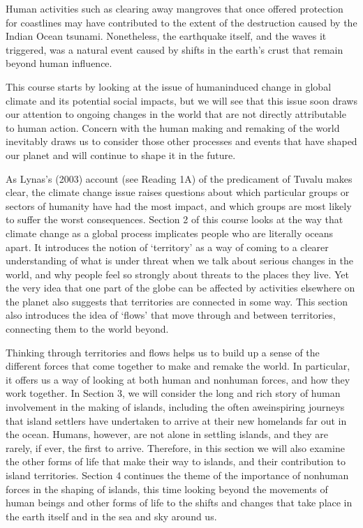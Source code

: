 \documentclass[letterpaper,10pt,english]{sphinxmanual}
\begin{document}
Human activities \textendash{} such as clearing away mangroves that once offered protection for coastlines \textendash{} may have contributed to the extent of the destruction caused by the Indian Ocean tsunami. Nonetheless, the earthquake itself, and the waves it triggered, was a natural event caused by shifts in the earth’s crust that remain beyond human influence.

This course starts by looking at the issue of human\sphinxhyphen{}induced change in global climate and its potential social impacts, but we will see that this issue soon draws our attention to ongoing changes in the world that are not directly attributable to human action. Concern with the human making and remaking of the world inevitably draws us to consider those other processes and events that have shaped our planet \textendash{} and will continue to shape it in the future.

As Lynas’s (2003) account (see Reading 1A) of the predicament of Tuvalu makes clear, the climate change issue raises questions about which particular groups or sectors of humanity have had the most impact, and which groups are most likely to suffer the worst consequences. Section 2 of this course looks at the way that climate change as a global process implicates people who are literally oceans apart. It introduces the notion of ‘territory’ as a way of coming to a clearer understanding of what
is under threat when we talk about serious changes in the world, and why people feel so strongly about threats to the places they live. Yet the very idea that one part of the globe can be affected by activities elsewhere on the planet also suggests that territories are connected in some way. This section also introduces the idea of ‘flows’ that move through and between territories, connecting them to the world beyond.

Thinking through territories and flows helps us to build up a sense of the different forces that come together to make and remake the world. In particular, it offers us a way of looking at both human and non\sphinxhyphen{}human forces, and how they work together. In Section 3, we will consider the long and rich story of human involvement in the making of islands, including the often awe\sphinxhyphen{}inspiring journeys that island settlers have undertaken to arrive at their new homelands far out in the ocean. Humans,
however, are not alone in settling islands, and they are rarely, if ever, the first to arrive. Therefore, in this section we will also examine the other forms of life that make their way to islands, and their contribution to island territories. Section 4 continues the theme of the importance of non\sphinxhyphen{}human forces in the shaping of islands, this time looking beyond the movements of human beings and other forms of life to the shifts and changes that take place in the earth itself and in the sea and
sky around us.
\end{document}
